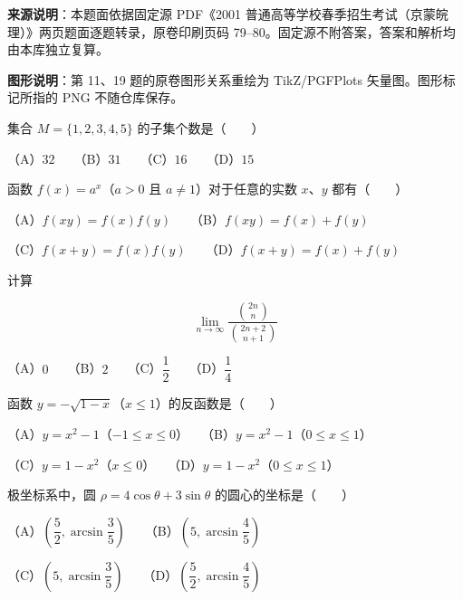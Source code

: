 


\begin{gktip}
\textbf{来源说明}：本题面依据固定源 PDF《2001 普通高等学校春季招生考试（京蒙皖理）》两页题面逐题转录，原卷印刷页码 79–80。固定源不附答案，答案和解析均由本库独立复算。

\textbf{图形说明}：第 11、19 题的原卷图形关系重绘为 TikZ/PGFPlots 矢量图。图形标记所指的 PNG 不随仓库保存。
\end{gktip}


\begin{question}
集合 $M=\{1,2,3,4,5\}$ 的子集个数是\mbox{（　　）}

（A）$32$　　（B）$31$　　（C）$16$　　（D）$15$

\end{question}
\begin{question}
函数 $f(x)=a^x$（$a>0$ 且 $a\ne1$）对于任意的实数 $x\text{、}y$ 都有\mbox{（　　）}

（A）$f(xy)=f(x)f(y)$　　（B）$f(xy)=f(x)+f(y)$

（C）$f(x+y)=f(x)f(y)$　　（D）$f(x+y)=f(x)+f(y)$

\end{question}
\begin{question}
计算

\nopagebreak[4]
\[
\lim_{n\to\infty}\frac{\binom{2n}{n}}{\binom{2n+2}{n+1}}
\]

（A）$0$　　（B）$2$　　（C）$\dfrac12$　　（D）$\dfrac14$

\end{question}
\begin{question}
函数 $y=-\sqrt{1-x}$（$x\le1$）的反函数是\mbox{（　　）}

（A）$y=x^2-1$（$-1\le x\le0$）　　（B）$y=x^2-1$（$0\le x\le1$）

（C）$y=1-x^2$（$x\le0$）　　（D）$y=1-x^2$（$0\le x\le1$）

\end{question}
\begin{question}
极坐标系中，圆 $\rho=4\cos\theta+3\sin\theta$ 的圆心的坐标是\mbox{（　　）}

（A）$\left(\dfrac52,\arcsin\dfrac35\right)$　　（B）$\left(5,\arcsin\dfrac45\right)$

（C）$\left(5,\arcsin\dfrac35\right)$　　（D）$\left(\dfrac52,\arcsin\dfrac45\right)$

\end{question}
